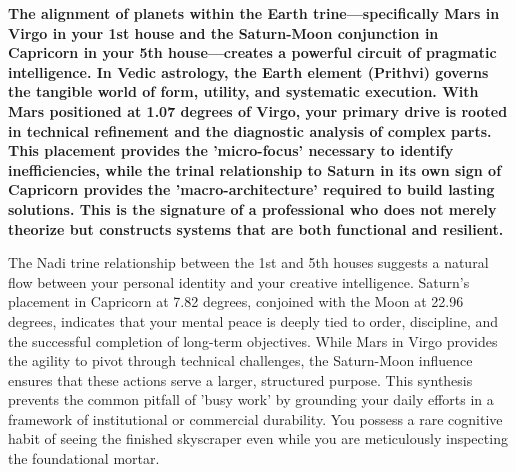 
\label{topic35}

{\fontsize{9.5}{13.8}\selectfont\bfseries\color{DeepSlate} The alignment of planets within the Earth trine---specifically Mars in Virgo in your 1st house and the Saturn-Moon conjunction in Capricorn in your 5th house---creates a powerful circuit of pragmatic intelligence. In Vedic astrology, the Earth element (Prithvi) governs the tangible world of form, utility, and systematic execution. With Mars positioned at 1.07 degrees of Virgo, your primary drive is rooted in technical refinement and the diagnostic analysis of complex parts. This placement provides the 'micro-focus' necessary to identify inefficiencies, while the trinal relationship to Saturn in its own sign of Capricorn provides the 'macro-architecture' required to build lasting solutions. This is the signature of a professional who does not merely theorize but constructs systems that are both functional and resilient.}\par\vspace{2mm}

{\fontsize{9}{13}\selectfont The Nadi trine relationship between the 1st and 5th houses suggests a natural flow between your personal identity and your creative intelligence. Saturn's placement in Capricorn at 7.82 degrees, conjoined with the Moon at 22.96 degrees, indicates that your mental peace is deeply tied to order, discipline, and the successful completion of long-term objectives. While Mars in Virgo provides the agility to pivot through technical challenges, the Saturn-Moon influence ensures that these actions serve a larger, structured purpose. This synthesis prevents the common pitfall of 'busy work' by grounding your daily efforts in a framework of institutional or commercial durability. You possess a rare cognitive habit of seeing the finished skyscraper even while you are meticulously inspecting the foundational mortar.}\par\vspace{1.8mm}

